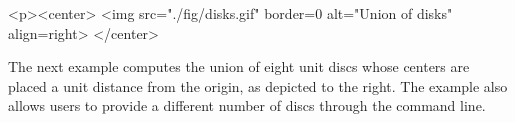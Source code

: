 \lcTex{%
  \setlength{\BooleanSetOpsWidthRight}{3.4cm}
  \setlength{\BooleanSetOpsWidthLeft}{\BooleanSetOpsWidthLineReal}
  \addtolength{\BooleanSetOpsWidthLeft}{-\BooleanSetOpsWidthRight}
  \begin{minipage}{\BooleanSetOpsWidthLeft}
}
\label{fig:disks}
\begin{ccHtmlOnly}
  <p><center>
    <img src="./fig/disks.gif" border=0 alt="Union of disks" align=right>
  </center>
\end{ccHtmlOnly}
The next example computes the union of eight unit discs whose centers are
placed a unit distance from the origin, as depicted to the right. The example
also allows users to provide a different number of discs through the command
line.

